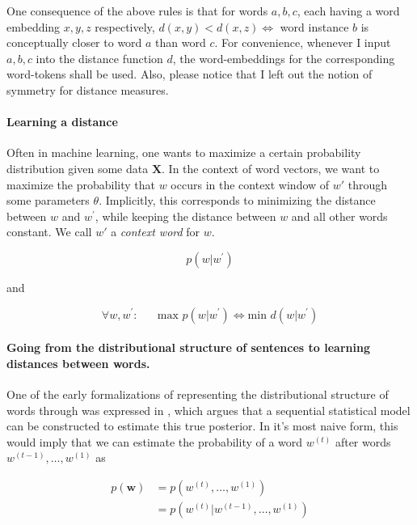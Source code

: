 \documentclass[a4paper,12pt,twoside,openright]{report}
\begin{document}
One consequence of the above rules is that for words $a, b, c$, each having a word embedding $x, y, z$ respectively, $d(x, y) < d(x, z) \iff $ word instance $b$ is conceptually closer to word $a$ than word $c$.
For convenience, whenever I input $a, b, c$ into the distance function $d$, the word-embeddings for the corresponding word-tokens shall be used.
Also, please notice that I left out the notion of symmetry for distance measures.

\paragraph{Learning a distance}
Often in machine learning, one wants to maximize a certain probability distribution given some data $\mathbf{X}$.
In the context of word vectors, we want to maximize the probability that $w$ occurs in the context window of $w \prime$ through some parameters $\theta$.
Implicitly, this corresponds to minimizing the distance between $w$ and $w^{\prime}$, while keeping the distance between $w$ and all other words constant. 
We call $w \prime$ a \textit{context word} for $w$.

\begin{equation}
p \left(w | w^{\prime}\right)
\end{equation}

and 

\begin{equation}
\forall w, w^{\prime} : \hspace{20pt} \text{max } p \left(w | w^{\prime}\right) \iff \text{min } d(w | w^{\prime})
\end{equation}

\paragraph{Going from the distributional structure of sentences to learning distances between words.} One of the early formalizations of representing the distributional structure of words through was expressed in \cite{bengio03}, which argues that a sequential statistical model can be constructed to estimate this true posterior.  
In it's most naive form, this would imply that we can estimate the probability of a word $w^{(t)}$ after words $w^{(t-1)}, \ldots, w^{(1)}$ as

\begin{align}
p(\mathbf{w}) &= p(w^{(t)}, \ldots, w^{(1)}) \\
&= p\left( w^{(t)} | w^{(t -1)}, \ldots, w^{(1)} \right)
\end{align}{\label{eq:naive_sequential_probability}}
\end{document}
